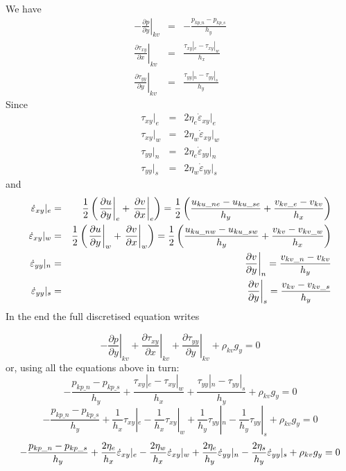 We have
\begin{eqnarray}
\left. -\frac{\partial p}{\partial y} \right|_{kv} 
&=& 
-\frac{p_{kp\_n}-p_{kp\_s}}{h_y}
\\
\left. \frac{\partial \tau_{xy}}{\partial x}  \right|_{kv} 
&=&
\frac{\tau_{xy}|_e - \tau_{xy}|_w}{h_x}
\\
\left. \frac{\partial \tau_{yy}}{\partial y}  \right|_{kv} 
&=&
\frac{\tau_{yy}|_n - \tau_{yy}|_s}{h_y}
\end{eqnarray}
Since
\begin{eqnarray}
\tau_{xy}|_e &=& 2 \eta_e \dot\varepsilon_{xy}|_e \\
\tau_{xy}|_w &=& 2 \eta_w \dot\varepsilon_{xy}|_w \\
\tau_{yy}|_n &=& 2 \eta_e \dot\varepsilon_{yy}|_n \\
\tau_{yy}|_s &=& 2 \eta_w \dot\varepsilon_{yy}|_s
\end{eqnarray}
and 
\begin{eqnarray}
\dot\varepsilon_{xy}|_e 
&=& \frac12 \left( 
\left.\frac{\partial u}{\partial y} \right|_e
+ 
\left.\frac{\partial v}{\partial x} \right|_e \right)
=
\frac12 \left(
\frac{u_{ku\_ne}-u_{ku\_se}}{h_y}
+
\frac{v_{kv\_e}-v_{kv}}{h_x}
\right) 
\nonumber\\
\dot\varepsilon_{xy}|_w 
&=& \frac12 \left( 
\left.\frac{\partial u}{\partial y} \right|_w
+ 
\left.\frac{\partial v}{\partial x} \right|_w \right)
=
\frac12 \left(
\frac{u_{ku\_nw}-u_{ku\_sw}}{h_y}
+
\frac{v_{kv}-v_{kv\_w}}{h_x}
\right) 
\nonumber\\
\dot\varepsilon_{yy}|_n
&=& 
\left. \frac{\partial v}{\partial y}\right|_n = \frac{v_{kv\_n}-v_{kv} }{h_y} \nonumber\\
\dot\varepsilon_{yy}|_s
&=& 
\left. \frac{\partial v}{\partial y}\right|_s = \frac{v_{kv}-v_{kv\_s} }{h_y} 
\end{eqnarray}
In the end the full discretised equation writes

\[
\left. -\frac{\partial p}{\partial y} \right|_{kv} 
+
\left. \frac{\partial \tau_{xy}}{\partial x}  \right|_{kv} 
+
\left. \frac{\partial \tau_{yy}}{\partial y}  \right|_{kv} 
+ \rho_{kv} g_y = 0
\]
or, using all the equations above in turn:
\[
-\frac{p_{kp\_n}-p_{kp\_s}}{h_y}
+
\frac{\tau_{xy}|_e - \tau_{xy}|_w}{h_x}
+
\frac{\tau_{yy}|_n - \tau_{yy}|_s}{h_y} 
+ \rho_{kv} g_y = 0
\]
\[
-\frac{p_{kp\_n}-p_{kp\_s}}{h_y}
+ \frac{1}{h_x} \tau_{xy}|_e -\frac{1}{h_x} \tau_{xy}|_w
+ \frac{1 }{h_y} \tau_{yy}|_n -\frac{1}{h_y} \tau_{yy}|_s
+ \rho_{kv} g_y = 0
\]
\[
-\frac{p_{kp\_n}-p_{kp\_s}}{h_y}
+ \frac{2 \eta_e}{h_x}  \dot\varepsilon_{xy}|_e 
-\frac{2 \eta_w}{h_x}  \dot\varepsilon_{xy}|_w
+ \frac{2 \eta_e }{h_y}  \dot\varepsilon_{yy}|_n \\
-\frac{2 \eta_s}{h_y}  \dot\varepsilon_{yy}|_s \\
+ \rho_{kv} g_y = 0
\]




